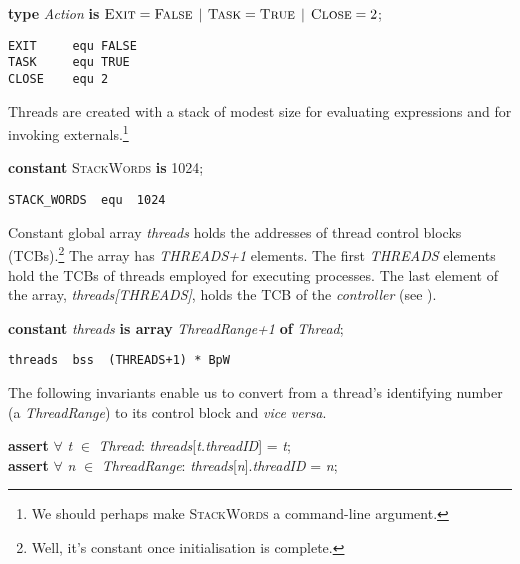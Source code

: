 \begin{tabbing}
\indents
\vb\>\textbf{type} \emph{Action} \textbf{is}
   $\textsc{Exit} = \textsc{False}$ $|$ $\textsc{Task} = \textsc{True}$ $|$ $\textsc{Close} = 2$;
\end{tabbing}

{\small
\begin{verbatim}
EXIT     equ FALSE
TASK     equ TRUE
CLOSE    equ 2
\end{verbatim}}

Threads are created with a stack of modest size for evaluating expressions and for invoking externals.\footnote{We should perhaps make \textsc{StackWords} a command-line argument.}

\begin{tabbing}
\indents
\vb\>\textbf{constant} \textsc{StackWords} \textbf{is} 1024;
\end{tabbing}

{\small
\begin{verbatim}
STACK_WORDS  equ  1024
\end{verbatim}}

Constant global array \emph{threads} holds the addresses of thread control blocks (TCBs).\footnote{Well, it's constant once initialisation is complete.} The array has \emph{\small THREADS+1} elements. The first \emph{\small THREADS} elements hold the TCBs of  threads employed for executing processes. The last element of the array, \emph{threads[{\small THREADS}]}, holds the TCB of the \emph{controller} (see ).

\begin{tabbing}
\indents
\vb\>\textbf{constant} \emph{threads} \textbf{is array} \emph{ThreadRange+1} \textbf{of} \emph{Thread};
\end{tabbing}

{\small
\begin{verbatim}
threads  bss  (THREADS+1) * BpW
\end{verbatim}}

The following invariants enable us to convert from a thread's identifying number (a \emph{ThreadRange}) to its control block and \emph{vice versa}.

\begin{tabbing}
\indents
\vb\>\textbf{assert} $\forall$ \emph{t} $\in$ \emph{Thread}: \emph{threads}[\emph{t.threadID}] = \emph{t}; \\
\vb\>\textbf{assert} $\forall$ \emph{n} $\in$ \emph{ThreadRange}: \emph{threads}[\emph{n}].\emph{threadID} = \emph{n};
\end{tabbing}

